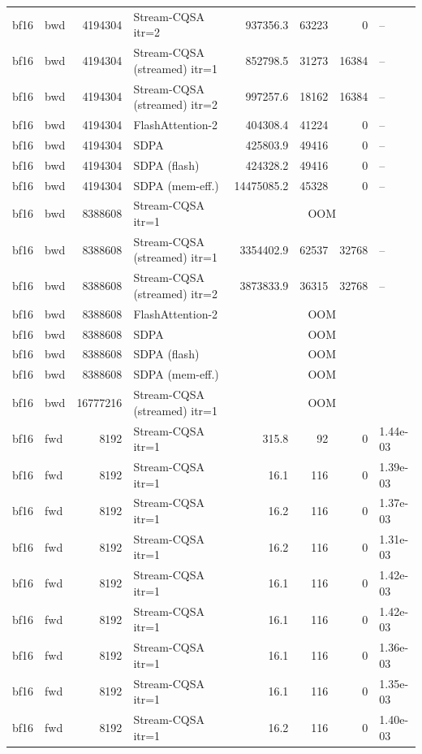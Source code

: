 \begin{tabular}{llrlrrrl}
bf16 & bwd & 4194304 & Stream-CQSA itr=2 & 937356.3 & 63223 & 0 & -- \\
bf16 & bwd & 4194304 & Stream-CQSA (streamed) itr=1 & 852798.5 & 31273 & 16384 & -- \\
bf16 & bwd & 4194304 & Stream-CQSA (streamed) itr=2 & 997257.6 & 18162 & 16384 & -- \\
bf16 & bwd & 4194304 & FlashAttention-2 & 404308.4 & 41224 & 0 & -- \\
bf16 & bwd & 4194304 & SDPA & 425803.9 & 49416 & 0 & -- \\
bf16 & bwd & 4194304 & SDPA (flash) & 424328.2 & 49416 & 0 & -- \\
bf16 & bwd & 4194304 & SDPA (mem-eff.) & 14475085.2 & 45328 & 0 & -- \\
bf16 & bwd & 8388608 & Stream-CQSA itr=1 & \multicolumn{4}{c}{OOM} \\
bf16 & bwd & 8388608 & Stream-CQSA (streamed) itr=1 & 3354402.9 & 62537 & 32768 & -- \\
bf16 & bwd & 8388608 & Stream-CQSA (streamed) itr=2 & 3873833.9 & 36315 & 32768 & -- \\
bf16 & bwd & 8388608 & FlashAttention-2 & \multicolumn{4}{c}{OOM} \\
bf16 & bwd & 8388608 & SDPA & \multicolumn{4}{c}{OOM} \\
bf16 & bwd & 8388608 & SDPA (flash) & \multicolumn{4}{c}{OOM} \\
bf16 & bwd & 8388608 & SDPA (mem-eff.) & \multicolumn{4}{c}{OOM} \\
bf16 & bwd & 16777216 & Stream-CQSA (streamed) itr=1 & \multicolumn{4}{c}{OOM} \\
bf16 & fwd & 8192 & Stream-CQSA itr=1 & 315.8 & 92 & 0 & 1.44e-03 \\
bf16 & fwd & 8192 & Stream-CQSA itr=1 & 16.1 & 116 & 0 & 1.39e-03 \\
bf16 & fwd & 8192 & Stream-CQSA itr=1 & 16.2 & 116 & 0 & 1.37e-03 \\
bf16 & fwd & 8192 & Stream-CQSA itr=1 & 16.2 & 116 & 0 & 1.31e-03 \\
bf16 & fwd & 8192 & Stream-CQSA itr=1 & 16.1 & 116 & 0 & 1.42e-03 \\
bf16 & fwd & 8192 & Stream-CQSA itr=1 & 16.1 & 116 & 0 & 1.42e-03 \\
bf16 & fwd & 8192 & Stream-CQSA itr=1 & 16.1 & 116 & 0 & 1.36e-03 \\
bf16 & fwd & 8192 & Stream-CQSA itr=1 & 16.1 & 116 & 0 & 1.35e-03 \\
bf16 & fwd & 8192 & Stream-CQSA itr=1 & 16.2 & 116 & 0 & 1.40e-03 \\

\end{tabular}
